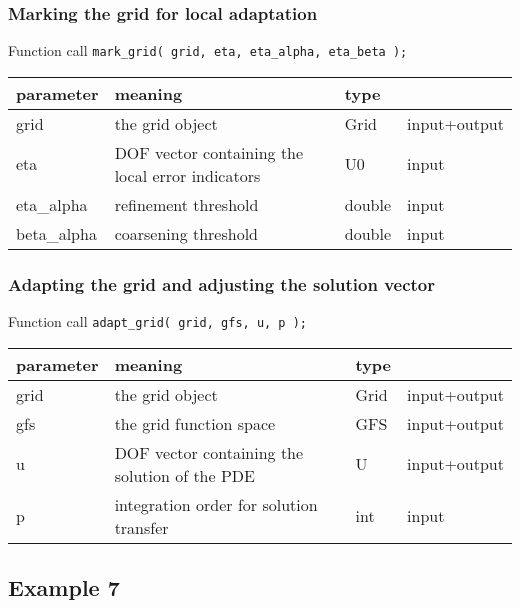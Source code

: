 \subsubsection*{Marking the grid for local adaptation}
\begin{block}{Function call}
  \lstinline{mark_grid( grid, eta, eta_alpha, eta_beta );}
\end{block}

\begin{tabular}{l|lll}
  parameter   & meaning                                          & type    &  \\
  \hline
  grid        & the grid object                                  & Grid    & input+output \\
  eta         & DOF vector containing the local error indicators & U0      & input \\
  eta\_alpha  & refinement threshold                             & double  & input \\
  beta\_alpha & coarsening threshold                             & double  & input \\
\end{tabular}


\subsubsection*{Adapting the grid and adjusting the solution vector}
\begin{block}{Function call}
  \lstinline{adapt_grid( grid, gfs, u, p );}
\end{block}

\begin{tabular}{l|lll}
  parameter   & meaning                                          & type    &  \\
  \hline
  grid        & the grid object                                  & Grid    & input+output \\
  gfs         & the grid function space                          & GFS     & input+output \\
  u           & DOF vector containing the solution of the PDE    & U       & input+output \\
  p           & integration order for solution transfer          & int     & input \\
\end{tabular}



\subsection{Example 7}

